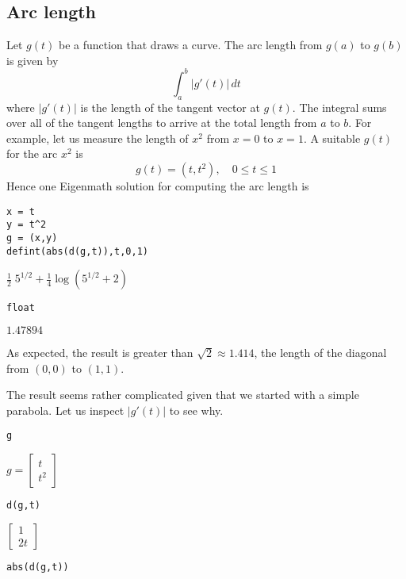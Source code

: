 \subsection{Arc length}

Let $g(t)$ be a function that draws a curve.
The arc length from $g(a)$ to $g(b)$ is given by
$$\int_a^b|g'(t)|\,dt$$
where $|g'(t)|$ is the length of the tangent vector at $g(t)$.
The integral sums over all of the tangent lengths to arrive at the total length
from $a$ to $b$.
For example, let us measure the length of $x^2$ from $x=0$ to $x=1$.
A suitable $g(t)$ for the arc $x^2$ is
$$g(t)=(t,t^2),\quad0\le t\le1$$
Hence one Eigenmath solution for computing the arc length is

\begin{Verbatim}[formatcom=\color{blue},samepage=true]
x = t
y = t^2
g = (x,y)
defint(abs(d(g,t)),t,0,1)
\end{Verbatim}

\noindent
$\displaystyle \tfrac{1}{2}\;5^{1/2}+\tfrac{1}{4}\log(5^{1/2}+2)$

\begin{Verbatim}[formatcom=\color{blue},samepage=true]
float
\end{Verbatim}

\noindent
$\displaystyle 1.47894$

\bigskip
\noindent
As expected, the result is greater than $\sqrt2\approx1.414$,
the length of the
diagonal from $(0,0)$ to $(1,1)$.

\bigskip
\noindent
The result seems rather complicated given that we
started with a simple parabola.
Let us inspect $|g'(t)|$ to see why.

\begin{Verbatim}[formatcom=\color{blue},samepage=true]
g
\end{Verbatim}

\noindent
$\displaystyle g=\begin{bmatrix}t\\ t^2\end{bmatrix}$

\begin{Verbatim}[formatcom=\color{blue},samepage=true]
d(g,t)
\end{Verbatim}

\noindent
$\displaystyle \begin{bmatrix}1\\ 2t\end{bmatrix}$

\begin{Verbatim}[formatcom=\color{blue},samepage=true]
abs(d(g,t))
\end{Verbatim}

